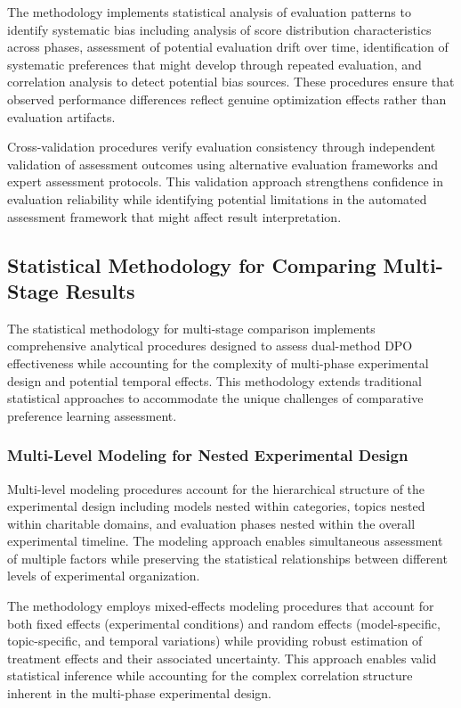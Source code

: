 The methodology implements statistical analysis of evaluation patterns to identify systematic bias including analysis of score distribution characteristics across phases, assessment of potential evaluation drift over time, identification of systematic preferences that might develop through repeated evaluation, and correlation analysis to detect potential bias sources. These procedures ensure that observed performance differences reflect genuine optimization effects rather than evaluation artifacts.

Cross-validation procedures verify evaluation consistency through independent validation of assessment outcomes using alternative evaluation frameworks and expert assessment protocols. This validation approach strengthens confidence in evaluation reliability while identifying potential limitations in the automated assessment framework that might affect result interpretation.

\subsection{Statistical Methodology for Comparing Multi-Stage Results}

The statistical methodology for multi-stage comparison implements comprehensive analytical procedures designed to assess dual-method DPO effectiveness while accounting for the complexity of multi-phase experimental design and potential temporal effects. This methodology extends traditional statistical approaches to accommodate the unique challenges of comparative preference learning assessment.

\subsubsection{Multi-Level Modeling for Nested Experimental Design}

Multi-level modeling procedures account for the hierarchical structure of the experimental design including models nested within categories, topics nested within charitable domains, and evaluation phases nested within the overall experimental timeline. The modeling approach enables simultaneous assessment of multiple factors while preserving the statistical relationships between different levels of experimental organization.

The methodology employs mixed-effects modeling procedures that account for both fixed effects (experimental conditions) and random effects (model-specific, topic-specific, and temporal variations) while providing robust estimation of treatment effects and their associated uncertainty. This approach enables valid statistical inference while accounting for the complex correlation structure inherent in the multi-phase experimental design.

